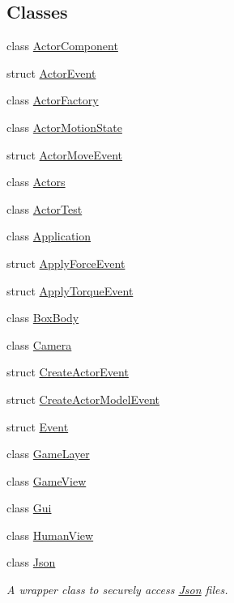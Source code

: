 \subsection*{Classes}
\begin{DoxyCompactItemize}
\item 
class \hyperlink{classTarbora_1_1ActorComponent}{Actor\+Component}
\item 
struct \hyperlink{structTarbora_1_1ActorEvent}{Actor\+Event}
\item 
class \hyperlink{classTarbora_1_1ActorFactory}{Actor\+Factory}
\item 
class \hyperlink{classTarbora_1_1ActorMotionState}{Actor\+Motion\+State}
\item 
struct \hyperlink{structTarbora_1_1ActorMoveEvent}{Actor\+Move\+Event}
\item 
class \hyperlink{classTarbora_1_1Actors}{Actors}
\item 
class \hyperlink{classTarbora_1_1ActorTest}{Actor\+Test}
\item 
class \hyperlink{classTarbora_1_1Application}{Application}
\item 
struct \hyperlink{structTarbora_1_1ApplyForceEvent}{Apply\+Force\+Event}
\item 
struct \hyperlink{structTarbora_1_1ApplyTorqueEvent}{Apply\+Torque\+Event}
\item 
class \hyperlink{classTarbora_1_1BoxBody}{Box\+Body}
\item 
class \hyperlink{classTarbora_1_1Camera}{Camera}
\item 
struct \hyperlink{structTarbora_1_1CreateActorEvent}{Create\+Actor\+Event}
\item 
struct \hyperlink{structTarbora_1_1CreateActorModelEvent}{Create\+Actor\+Model\+Event}
\item 
struct \hyperlink{structTarbora_1_1Event}{Event}
\item 
class \hyperlink{classTarbora_1_1GameLayer}{Game\+Layer}
\item 
class \hyperlink{classTarbora_1_1GameView}{Game\+View}
\item 
class \hyperlink{classTarbora_1_1Gui}{Gui}
\item 
class \hyperlink{classTarbora_1_1HumanView}{Human\+View}
\item 
class \hyperlink{classTarbora_1_1Json}{Json}
\begin{DoxyCompactList}\small\item\em A wrapper class to securely access \hyperlink{classTarbora_1_1Json}{Json} files. \end{DoxyCompactList}\item 

\end{DoxyCompactItemize}
